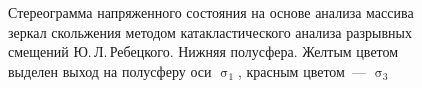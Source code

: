 \begin{figure}[H]
\begin{changemargin}{0cm}{0cm}
\begin{center}
\begin{minipage}[h]{0.33\linewidth}
        \caption{Стереограмма напряженного состояния на основе
    анализа массива зеркал скольжения методом катакластического анализа разрывных смещений Ю.\,Л.\,Ребецкого.
    Нижняя полусфера. Желтым цветом выделен выход на полусферу оси $\upsigma_1$, красным цветом~--- $\upsigma_3$}
        \label{fig:kondratev-fig3}
    \end{minipage}


  \end{center}
\end{changemargin}

\end{figure}
